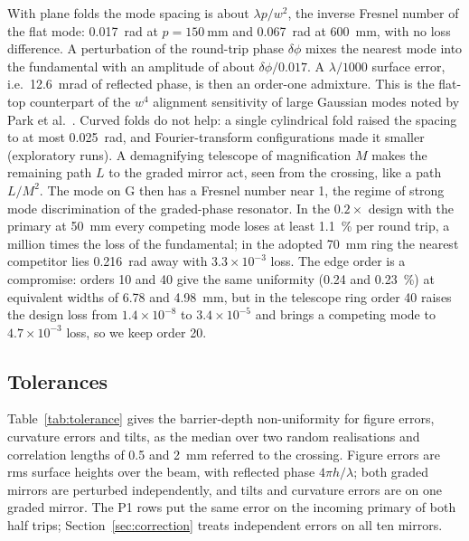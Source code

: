 \documentclass[11pt]{article}
\begin{document}
With plane folds the mode spacing is about $\lambda p / w^{2}$, the inverse Fresnel number of the flat
mode: \SI{0.017}{\radian} at $p = \SI{150}{\milli\metre}$ and \SI{0.067}{\radian} at
\SI{600}{\milli\metre}, with no loss difference. A perturbation of the round-trip phase $\delta\phi$
mixes the nearest mode into the fundamental with an amplitude of about $\delta\phi/0.017$. A
$\lambda/1000$ surface error, i.e.\ \SI{12.6}{\milli\radian} of reflected phase, is then an order-one
admixture. This is the flat-top counterpart of the $w^{4}$ alignment sensitivity of large Gaussian
modes noted by Park et al.~\cite{Park2022}. Curved folds do not help: a single cylindrical fold raised
the spacing to at most \SI{0.025}{\radian}, and Fourier-transform configurations made it smaller
(exploratory runs). A demagnifying telescope of magnification $M$ makes the remaining path $L$ to the
graded mirror act, seen from the crossing, like a path $L/M^{2}$. The mode on G then has a Fresnel
number near 1, the regime of strong mode discrimination of the graded-phase resonator. In the
$0.2\times$ design with the primary at \SI{50}{\milli\metre} every competing mode loses at least
\SI{1.1}{\percent} per round trip, a million times the loss of the fundamental; in the adopted
\SI{70}{\milli\metre} ring the nearest competitor lies \SI{0.216}{\radian} away with $3.3\times10^{-3}$ loss. The edge order is a compromise: orders 10 and 40 give the same
uniformity (0.24 and \SI{0.23}{\percent}) at equivalent widths of 6.78 and \SI{4.98}{\milli\metre},
but in the telescope ring order 40 raises the design loss from $1.4\times10^{-8}$ to $3.4\times10^{-5}$
and brings a competing mode to $4.7\times10^{-3}$ loss, so we keep order 20.

\subsection{Tolerances}

Table~\ref{tab:tolerance} gives the barrier-depth non-uniformity for figure errors, curvature errors
and tilts, as the median over two random realisations and correlation lengths of 0.5 and
\SI{2}{\milli\metre} referred to the crossing. Figure errors are rms surface heights over the beam,
with reflected phase $4\pi h/\lambda$; both graded mirrors are perturbed independently, and tilts and
curvature errors are on one graded mirror. The P1 rows put the same error on the incoming primary of
both half trips; Section~\ref{sec:correction} treats independent errors on all ten mirrors.
\end{document}

